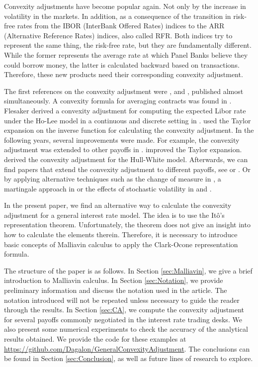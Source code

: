 \documentclass[a4paper,10pt]{article}
\newcommand{\1}{\mathbf{1}}
\begin{document}
Convexity adjustments have become popular again. Not only by the increase in volatility in the markets. In addition, as a consequence of the transition in risk-free rates from the IBOR (InterBank Offered Rates) indices to the ARR (Alternative Reference Rates) indices, also called RFR. Both indices try to represent the same thing, the risk-free rate, but they are fundamentally different. While the former represents the average rate at which Panel Banks believe they could borrow money, the latter is calculated backward based on transactions. Therefore, these new products need their corresponding convexity adjustment. 

The first references on the convexity adjustment were \cite{RitchkenS}, \cite{Flesaker} and \cite{BrothertonIben}, published almost simultaneously. A convexity formula for averaging contracts was found in \cite{RitchkenS}. Flesaker derived a convexity adjustment for computing the expected Libor rate under the Ho-Lee model in a continuous and discrete setting in \cite{Flesaker}. \cite{BrothertonIben} used the Taylor expansion on the inverse function for calculating the convexity adjustment. In the following years, several improvements were made. For example, the convexity adjustment was extended to other payoffs in \cite{Hull06}. \cite{Hart} improved the Taylor expansion. \cite{KirikosNovak} derived the convexity adjustment for the Hull-White model. Afterwards, we can find papers that extend the convexity adjustment to different payoffs, see \cite{Benhamou00WC} or \cite{Hagan03}. Or by applying alternative techniques such as the change of measure in \cite{Pelsser}, a martingale approach in \cite{Benhamou00} or the effects of stochastic volatility in \cite{PiterbargRenedo} and \cite{HaganWoodward20}.

In the present paper, we find an alternative way to calculate the convexity adjustment for a general interest rate model. The idea is to use the It\^o's representation theorem. Unfortunately, the theorem does not give an insight into how to calculate the elements therein. Therefore, it is necessary to introduce basic concepts of Malliavin calculus to apply the Clark-Ocone representation formula.

The structure of the paper is as follows. In Section \ref{sec:Malliavin}, we give a brief introduction to Malliavin calculus. In Section \ref{sec:Notation}, we provide preliminary information and discuss the notation used in the article. The notation introduced will not be repeated unless necessary to guide the reader through the results. In Section \ref{sec:CA}, we compute the convexity adjustment for several payoffs commonly negotiated in the interest rate trading desks. We also present some numerical experiments to check the accuracy of the analytical results obtained. We provide the code for these examples at \url{https://github.com/Dagalon/GeneralConvexityAdjustment}.
The conclusions can be found in Section \ref{sec:Conclusion}, as well as future lines of research to explore.
\end{document}
